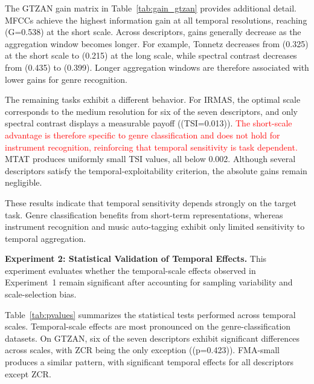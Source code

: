 \documentclass[runningheads]{llncs}
\begin{document}
The GTZAN gain matrix in Table~\ref{tab:gain_gtzan} provides additional detail. MFCCs achieve the highest information gain at all temporal resolutions, reaching (G=0.538) at the short scale. Across descriptors, gains generally decrease as the aggregation window becomes longer. For example, Tonnetz decreases from (0.325) at the short scale to (0.215) at the long scale, while spectral contrast decreases from (0.435) to (0.399). Longer aggregation windows are therefore associated with lower gains for genre recognition.

The remaining tasks exhibit a different behavior. For IRMAS, the optimal scale corresponds to the medium resolution for six of the seven descriptors, and only spectral contrast displays a measurable payoff ((TSI=0.013)). \textcolor{red}{The short-scale advantage is therefore specific to genre classification and does not hold for instrument recognition, reinforcing that temporal sensitivity is task dependent.} MTAT produces uniformly small TSI values, all below 0.002. Although several descriptors satisfy the temporal-exploitability criterion, the absolute gains remain negligible.

These results indicate that temporal sensitivity depends strongly on the target task. Genre classification benefits from short-term representations, whereas instrument recognition and music auto-tagging exhibit only limited sensitivity to temporal aggregation.



\textbf{Experiment 2: Statistical Validation of Temporal Effects.}
This experiment evaluates whether the temporal-scale effects observed in Experiment~1 remain significant after accounting for sampling variability and scale-selection bias.

Table~\ref{tab:pvalues} summarizes the statistical tests performed across temporal scales. Temporal-scale effects are most pronounced on the genre-classification datasets. On GTZAN, six of the seven descriptors exhibit significant differences across scales, with ZCR being the only exception ((p=0.423)). FMA-small produces a similar pattern, with significant temporal effects for all descriptors except ZCR.
\end{document}
